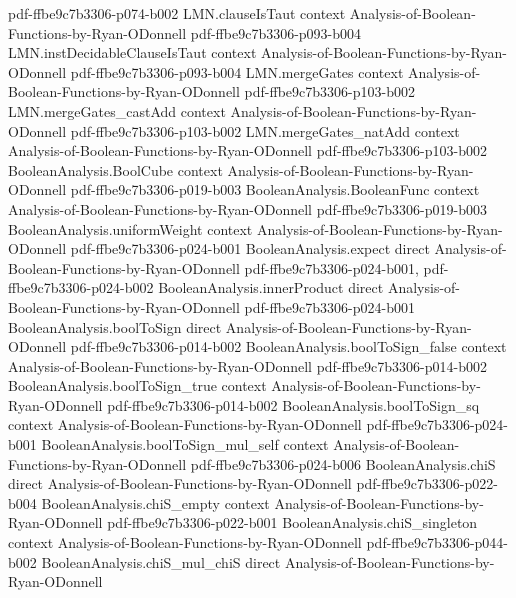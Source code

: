 \begin{theorem}
  {pdf-ffbe9c7b3306-p074-b002}
\proofstep
  {LMN.clauseIsTaut}
  {context}
  {Analysis-of-Boolean-Functions-by-Ryan-ODonnell}
  {pdf-ffbe9c7b3306-p093-b004}
\proofstep
  {LMN.instDecidableClauseIsTaut}
  {context}
  {Analysis-of-Boolean-Functions-by-Ryan-ODonnell}
  {pdf-ffbe9c7b3306-p093-b004}
\proofstep
  {LMN.mergeGates}
  {context}
  {Analysis-of-Boolean-Functions-by-Ryan-ODonnell}
  {pdf-ffbe9c7b3306-p103-b002}
\proofstep
  {LMN.mergeGates_castAdd}
  {context}
  {Analysis-of-Boolean-Functions-by-Ryan-ODonnell}
  {pdf-ffbe9c7b3306-p103-b002}
\proofstep
  {LMN.mergeGates_natAdd}
  {context}
  {Analysis-of-Boolean-Functions-by-Ryan-ODonnell}
  {pdf-ffbe9c7b3306-p103-b002}
\proofstep
  {BooleanAnalysis.BoolCube}
  {context}
  {Analysis-of-Boolean-Functions-by-Ryan-ODonnell}
  {pdf-ffbe9c7b3306-p019-b003}
\proofstep
  {BooleanAnalysis.BooleanFunc}
  {context}
  {Analysis-of-Boolean-Functions-by-Ryan-ODonnell}
  {pdf-ffbe9c7b3306-p019-b003}
\proofstep
  {BooleanAnalysis.uniformWeight}
  {context}
  {Analysis-of-Boolean-Functions-by-Ryan-ODonnell}
  {pdf-ffbe9c7b3306-p024-b001}
\proofstep
  {BooleanAnalysis.expect}
  {direct}
  {Analysis-of-Boolean-Functions-by-Ryan-ODonnell}
  {pdf-ffbe9c7b3306-p024-b001,
    pdf-ffbe9c7b3306-p024-b002}
\proofstep
  {BooleanAnalysis.innerProduct}
  {direct}
  {Analysis-of-Boolean-Functions-by-Ryan-ODonnell}
  {pdf-ffbe9c7b3306-p024-b001}
\proofstep
  {BooleanAnalysis.boolToSign}
  {direct}
  {Analysis-of-Boolean-Functions-by-Ryan-ODonnell}
  {pdf-ffbe9c7b3306-p014-b002}
\proofstep
  {BooleanAnalysis.boolToSign_false}
  {context}
  {Analysis-of-Boolean-Functions-by-Ryan-ODonnell}
  {pdf-ffbe9c7b3306-p014-b002}
\proofstep
  {BooleanAnalysis.boolToSign_true}
  {context}
  {Analysis-of-Boolean-Functions-by-Ryan-ODonnell}
  {pdf-ffbe9c7b3306-p014-b002}
\proofstep
  {BooleanAnalysis.boolToSign_sq}
  {context}
  {Analysis-of-Boolean-Functions-by-Ryan-ODonnell}
  {pdf-ffbe9c7b3306-p024-b001}
\proofstep
  {BooleanAnalysis.boolToSign_mul_self}
  {context}
  {Analysis-of-Boolean-Functions-by-Ryan-ODonnell}
  {pdf-ffbe9c7b3306-p024-b006}
\proofstep
  {BooleanAnalysis.chiS}
  {direct}
  {Analysis-of-Boolean-Functions-by-Ryan-ODonnell}
  {pdf-ffbe9c7b3306-p022-b004}
\proofstep
  {BooleanAnalysis.chiS_empty}
  {context}
  {Analysis-of-Boolean-Functions-by-Ryan-ODonnell}
  {pdf-ffbe9c7b3306-p022-b001}
\proofstep
  {BooleanAnalysis.chiS_singleton}
  {context}
  {Analysis-of-Boolean-Functions-by-Ryan-ODonnell}
  {pdf-ffbe9c7b3306-p044-b002}
\proofstep
  {BooleanAnalysis.chiS_mul_chiS}
  {direct}
  {Analysis-of-Boolean-Functions-by-Ryan-ODonnell}

\end{theorem}
